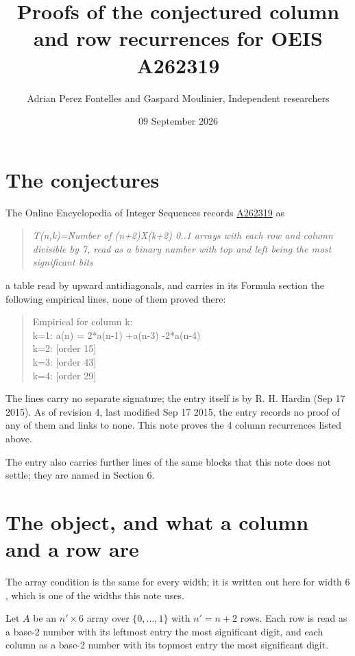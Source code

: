 \documentclass[11pt]{article}
\title{Proofs of the conjectured column and row recurrences for OEIS A262319}
\author{Adrian Perez Fontelles and Gaspard Moulinier, Independent researchers}
\date{09 September 2026}
\theoremstyle{definition}
\begin{document}
\maketitle
\section{The conjectures}

The Online Encyclopedia of Integer Sequences records \href{https://oeis.org/A262319}{A262319} as

\begin{quote}\itshape T(n,k)=Number of (n+2)X(k+2) 0..1 arrays with each row and column divisible by 7, read as a binary number with top and left being the most significant bits\end{quote}

a table read by upward antidiagonals, and carries in its Formula section the following empirical lines, none of them proved there:

\begin{quote}\ttfamily Empirical for column k:\\
k=1: a(n) = 2*a(n-1) +a(n-3) -2*a(n-4)\\k=2: [order 15]\\k=3: [order 43]\\k=4: [order 29]\end{quote}

The lines carry no separate signature; the entry itself is by R. H. Hardin (Sep 17 2015). As of revision 4, last modified Sep 17 2015, the entry records no proof of any of them and links to none. This note proves the 4 column recurrences listed above.

The entry also carries further lines of the same blocks that this note does not settle; they are named in Section 6.

\section{The object, and what a column and a row are}

The array condition is the same for every width; it is written out here for width $6$, which is one of the widths this note uses.

Let $A$ be an $n' \times 6$ array over $\{0,\dots,1\}$ with $n' = n + 2$ rows. Each row is read as a base-$2$ number with its leftmost entry the most significant digit, and each column as a base-$2$ number with its topmost entry the most significant digit.
\end{document}
